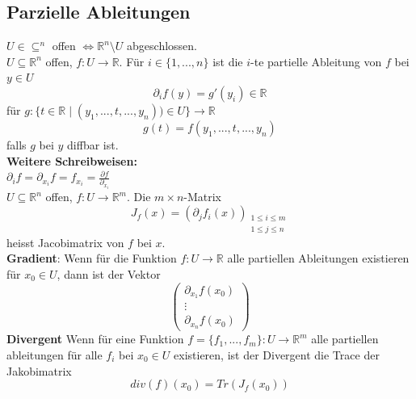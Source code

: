 \subsection{Parzielle Ableitungen}
    $U\in\subseteq^n$ offen $\iff \mathbb R^n\setminus U$ abgeschlossen.\\
    $U\subseteq\mathbb R^n$ offen, $f:U\rightarrow\mathbb R$. Für
    $i\in\{1,...,n\}$ ist die $i$-te partielle Ableitung von $f$ bei $y\in U$
    $$\partial_if(y)=g'(y_i)\in\mathbb R$$ für $g:\{t\in\mathbb
    R\mid(y_1,...,t,...,y_n))\in U\}\rightarrow\mathbb R$
    $$g(t)=f(y_1,...,t,...,y_n)$$ falls $g$ bei $y$ diffbar ist.\\
    \textbf{Weitere Schreibweisen:}\\
    $\partial_if=\partial_{x_i}f=f_{x_i}=\frac{\partial f}{\partial_{x_i}}$\\
    $U\subseteq\mathbb R^n$ offen, $f:U\rightarrow\mathbb R^m$. Die $m\times
    n$-Matrix $$J_f(x)=(\partial_jf_i(x))_{\substack{1\leq i\leq m\\1\leq j\leq
    n}}$$
    heisst Jacobimatrix von $f$ bei $x$.\\
  \textbf{Gradient}: Wenn für die Funktion $f:U\rightarrow \mathbb R$ alle partiellen Ableitungen existieren für $x_0\in U$, dann ist der Vektor $$\begin{pmatrix}\partial_{x_1}f(x_0)\\\vdots\\\partial_{x_n}f(x_0)\end{pmatrix}$$
    \textbf{Divergent} Wenn für eine Funktion $f=\{f_1,...,f_m\}:U\rightarrow\mathbb R^m$ alle partiellen ableitungen für alle $f_i$ bei $x_0\in U$ existieren, ist der Divergent die Trace der Jakobimatrix $$div(f)(x_0)=Tr(J_f(x_0))$$
